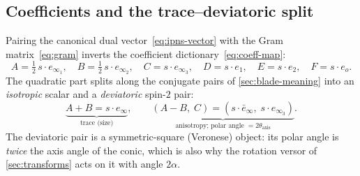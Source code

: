 \documentclass{birkjour}
\theoremstyle{definition}
\theoremstyle{remark}
\newcommand{\eo}{e_o}
\newcommand{\einf}{e_\infty}
\newcommand{\einfbar}{\bar e_\infty}
\begin{document}
\subsection{Coefficients and the trace--deviatoric split}
Pairing the canonical dual vector~\eqref{eq:ipns-vector} with the Gram
matrix~\eqref{eq:gram} inverts the coefficient dictionary~\eqref{eq:coeff-map}:
\begin{equation}\label{eq:coeff-extract}
  A=\tfrac12\, s\!\cdot e_{\infty_1},\quad
  B=\tfrac12\, s\!\cdot e_{\infty_2},\quad
  C= s\!\cdot e_{\infty_3},\quad
  D= s\!\cdot e_1,\quad
  E= s\!\cdot e_2,\quad
  F= s\!\cdot \eo .
\end{equation}
The quadratic part splits along the conjugate pairs of
\cref{sec:blade-meaning} into an \emph{isotropic} scalar and a
\emph{deviatoric} spin-$2$ pair:
\begin{equation}\label{eq:trace-deviatoric}
  \underbrace{A+B = s\!\cdot\einf}_{\text{trace (size)}},
  \qquad
  \underbrace{(A-B,\;C) = (s\!\cdot\einfbar,\; s\!\cdot e_{\infty_3})}_{\text{anisotropy; polar angle } = 2\theta_{\text{axis}}} .
\end{equation}
The deviatoric pair is a symmetric-square (Veronese) object: its polar angle
is \emph{twice} the axis angle of the conic, which is also why the rotation
versor of \cref{sec:transforms} acts on it with angle $2\alpha$.
\end{document}

